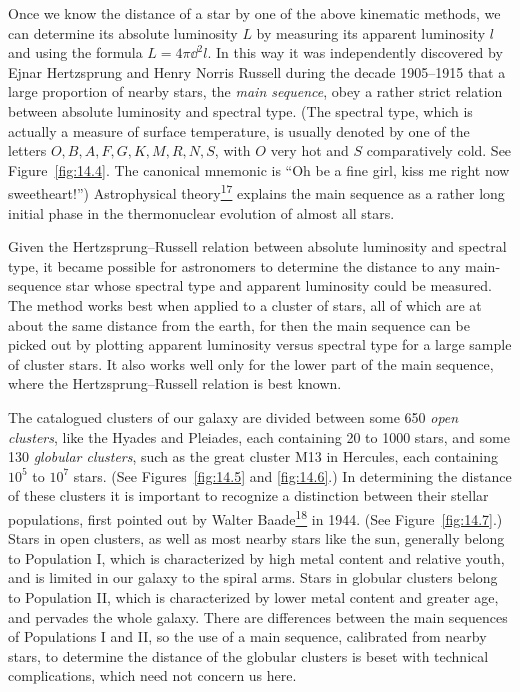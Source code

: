 Once we know the distance of a star by one of the above kinematic methods, we
can determine its absolute luminosity \(L\) by measuring its apparent
luminosity \(l\) and using the formula \(L=4\pi \dd^2l\). In this way it was
independently discovered by Ejnar Hertzsprung and Henry Norris Russell during
the decade 1905--1915 that a large proportion of nearby stars, the
\emph{main sequence}, obey a rather strict relation between absolute
luminosity and spectral type. (The spectral type, which is actually a
measure of surface temperature, is usually denoted by one of the letters
\(O,B,A,F,G,K,M,R,N,S\), with \(O\) very hot and \(S\) comparatively cold.
See Figure~\ref{fig:14.4}. The canonical mnemonic is ``Oh be a fine girl,
kiss me right now sweetheart!'') Astrophysical
theory\hyperref[ch14-ref-17]{\textsuperscript{17}} explains the main
sequence as a rather long initial phase in the thermonuclear evolution of
almost all stars.



Given the Hertzsprung--Russell relation between absolute luminosity and
spectral type, it became possible for astronomers to determine the distance
to any main-sequence star whose spectral type and apparent luminosity could
be measured. The method works best when applied to a cluster of stars, all
of which are at about the same distance from the earth, for then the main
sequence can be picked out by plotting apparent luminosity versus spectral
type for a large sample of cluster stars. It also works well only for the
lower part of the main sequence, where the Hertzsprung--Russell relation is
best known.

The catalogued clusters of our galaxy are divided between some 650
\emph{open clusters}, like the Hyades and Pleiades, each containing 20 to
1000 stars, and some 130 \emph{globular clusters}, such as the great cluster
M13 in Hercules, each containing \(10^5\) to \(10^7\) stars. (See
Figures~\ref{fig:14.5} and \ref{fig:14.6}.) In determining the distance of
these clusters it is important to recognize a distinction between their
stellar populations, first pointed out by Walter
Baade\hyperref[ch14-ref-18]{\textsuperscript{18}} in 1944. (See
Figure~\ref{fig:14.7}.) Stars in open clusters, as well as most nearby stars
like the sun, generally belong to Population I, which is characterized by
high metal content and relative youth, and is limited in our galaxy to the
spiral arms. Stars in globular clusters belong to Population II, which is
characterized by lower metal content and greater age, and pervades the whole
galaxy. There are differences between the main sequences of Populations I
and II, so the use of a main sequence, calibrated from nearby stars, to
determine the distance of the globular clusters is beset with technical
complications, which need not concern us here.

